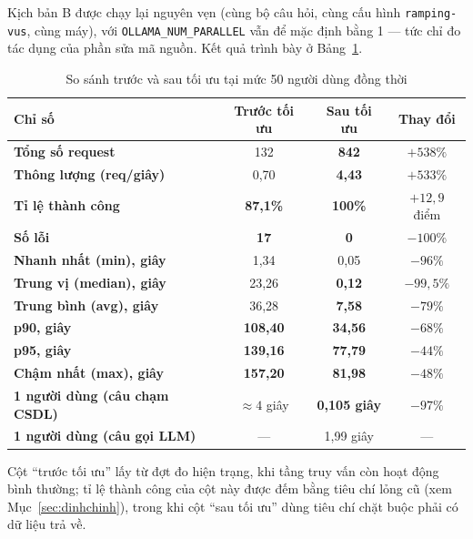 \documentclass[12pt,a4paper]{article}
\newcommand{\ok}[1]{\textcolor{successgreen}{\bfseries #1}}
\newcommand{\warn}[1]{\textcolor{warnorange}{\bfseries #1}}
\newcommand{\bad}[1]{\textcolor{dangerred}{\bfseries #1}}
\begin{document}
Kịch bản B được chạy lại nguyên vẹn (cùng bộ câu hỏi, cùng cấu hình
\texttt{ramping-vus}, cùng máy), với \texttt{OLLAMA\_NUM\_PARALLEL} vẫn để mặc
định bằng 1 --- tức chỉ đo tác dụng của phần sửa mã nguồn. Kết quả trình bày ở
Bảng~\ref{tab:sosanh}.

\begin{table}[H]
\centering
\caption{So sánh trước và sau tối ưu tại mức 50 người dùng đồng thời}
\label{tab:sosanh}
\begin{tabularx}{\textwidth}{>{\bfseries}Xccc}
\toprule
\rowcolor{lightblue}
Chỉ số & Trước tối ưu & Sau tối ưu & Thay đổi\\
\midrule
Tổng số request        & 132 & \ok{842} & $+538\%$\\
Thông lượng (req/giây) & 0,70 & \ok{4,43} & $+533\%$\\
Tỉ lệ thành công       & \warn{87,1\%} & \ok{100\%} & $+12{,}9$ điểm\\
Số lỗi                 & \bad{17} & \ok{0} & $-100\%$\\
\midrule
Nhanh nhất (min), giây & 1,34  & 0,05 & $-96\%$\\
Trung vị (median), giây & 23,26 & \ok{0,12} & $-99{,}5\%$\\
Trung bình (avg), giây & 36,28 & \ok{7,58} & $-79\%$\\
p90, giây              & \bad{108,40} & \ok{34,56} & $-68\%$\\
p95, giây              & \bad{139,16} & \warn{77,79} & $-44\%$\\
Chậm nhất (max), giây  & \bad{157,20} & \ok{81,98} & $-48\%$\\
\midrule
1 người dùng (câu chạm CSDL) & $\approx 4$ giây & \ok{0,105 giây} & $-97\%$\\
1 người dùng (câu gọi LLM) & --- & 1,99 giây & ---\\
\bottomrule
\end{tabularx}

\vspace{0.15cm}
{\small Cột ``trước tối ưu'' lấy từ đợt đo hiện trạng, khi tầng truy vấn còn hoạt
động bình thường; tỉ lệ thành công của cột này được đếm bằng tiêu chí lỏng cũ
(xem Mục~\ref{sec:dinhchinh}), trong khi cột ``sau tối ưu'' dùng tiêu chí chặt
buộc phải có dữ liệu trả về.}
\end{table}
\end{document}
